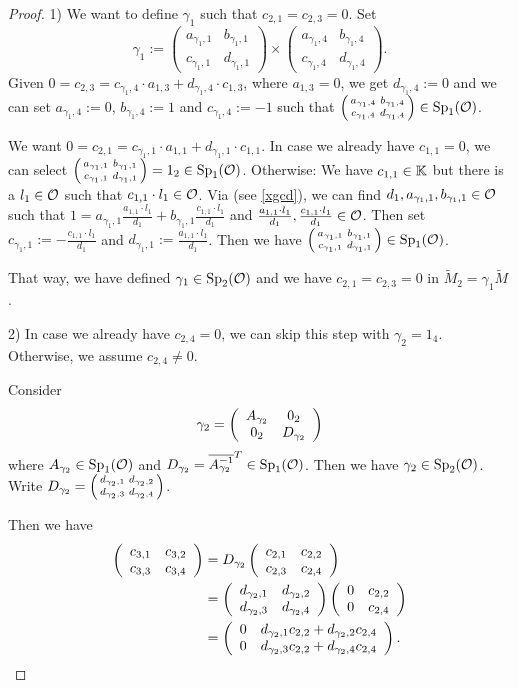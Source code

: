 \begin{lemma}[$solveR$]
\begin{proof}
1) We want to define $\gamma_1$ such that $c_{2,1} = c_{2,3} = 0$.
Set
\[ \gamma_1 := \begin{pmatrix}
a_{\gamma_1,1} & b_{\gamma_1,1} \\
c_{\gamma_1,1} & d_{\gamma_1,1}
\end{pmatrix} \times \begin{pmatrix}
a_{\gamma_1,4} & b_{\gamma_1,4} \\
c_{\gamma_1,4} & d_{\gamma_1,4}
\end{pmatrix} . \]
Given $0 = c_{2,3} = c_{\gamma_1,4} \cdot a_{1,3} + d_{\gamma_1,4} \cdot c_{1,3}$, where $a_{1,3} = 0$, we get $d_{\gamma_1,4} := 0$ and we can set $a_{\gamma_1,4} := 0$, $b_{\gamma_1,4} := 1$ and $c_{\gamma_1,4} := -1$ such that $\left( \begin{smallmatrix} a_{\gamma_1,4} & b_{\gamma_1,4} \\ c_{\gamma_1,4} & d_{\gamma_1,4} \end{smallmatrix} \right) \in \operatorname{Sp}_1(\mathcal{O})$.

We want $0 = c_{2,1} = c_{\gamma_1,1} \cdot a_{1,1} + d_{\gamma_1,1} \cdot c_{1,1}$. In case we already have $c_{1,1} = 0$, we can select $\left( \begin{smallmatrix} a_{\gamma_1,1} & b_{\gamma_1,1} \\ c_{\gamma_1,1} & d_{\gamma_1,1} \end{smallmatrix} \right)  = 1_2 \in \operatorname{Sp}_1(\mathcal{O})$. Otherwise: We have $c_{1,1} \in \mathbb{K}$ but there is a $l_1 \in \mathcal{O}$ such that $c_{1,1} \cdot l_1 \in \mathcal{O}$. Via  (see \cref{xgcd}), we can find $d_1,a_{\gamma_1,1},b_{\gamma_1,1} \in \mathcal{O}$ such that $1 = a_{\gamma_1,1} \frac{a_{1,1} \cdot l_1}{d_1} + b_{\gamma_1,1} \frac{c_{1,1} \cdot l_1}{d_1}$ and $\frac{a_{1,1} \cdot l_1}{d_1},  \frac{c_{1,1} \cdot l_1}{d_1} \in \mathcal{O}$. Then set $c_{\gamma_1,1} := - \frac{c_{1,1} \cdot l_1}{d_1}$ and $d_{\gamma_1,1} := \frac{a_{1,1} \cdot l_1}{d_1}$. Then we have $\left( \begin{smallmatrix} a_{\gamma_1,1} & b_{\gamma_1,1} \\ c_{\gamma_1,1} & d_{\gamma_1,1} \end{smallmatrix} \right) \in \operatorname{Sp}_1(\mathcal{O})$.

That way, we have defined $\gamma_1 \in \operatorname{Sp}_2(\mathcal{O})$ and we have $c_{2,1} = c_{2,3} = 0$ in $\tilde{M}_2 = \gamma_1 \tilde{M}$.

2) In case we already have $c_{2,4} = 0$, we can skip this step with $\gamma_2 = 1_4$. Otherwise, we assume $c_{2,4} \ne 0$.

Consider
\[ \gamma_{2} = \left( \begin{array}{cc} A_{\gamma_2} & 0_2 \\ 0_2 & D_{\gamma_2} \end{array} \right) \]
where $A_{\gamma_2} \in \operatorname{Sp}_1(\mathcal{O})$ and $D_{\gamma_2} = \overline{A_{\gamma_2}^{-1}}^T \in \operatorname{Sp}_1(\mathcal{O})$. Then we have $\gamma_2 \in \operatorname{Sp}_2(\mathcal{O})$. Write $D_{\gamma_2} = \left( \begin{smallmatrix} d_{\gamma_2,1} & d_{\gamma_2,2} \\ d_{\gamma_2,3} & d_{\gamma_2,4} \end{smallmatrix} \right)$.

Then we have
\begin{align*}
\left( \begin{array}{cc} c_{3,1} & c_{3,2} \\ c_{3,3} & c_{3,4} \end{array} \right) &= D_{\gamma_2} \left( \begin{array}{cc} c_{2,1} & c_{2,2} \\ c_{2,3} & c_{2,4} \end{array} \right) \\
&= \left( \begin{array}{cc} d_{\gamma_2,1} & d_{\gamma_2,2} \\ d_{\gamma_2,3} & d_{\gamma_2,4} \end{array} \right) \left( \begin{array}{cc} 0 & c_{2,2} \\ 0 & c_{2,4} \end{array} \right) \\
&= \left( \begin{array}{cc} 0 & d_{\gamma_2,1} c_{2,2} + d_{\gamma_2,2} c_{2,4} \\ 0 & d_{\gamma_2,3} c_{2,2} + d_{\gamma_2,4} c_{2,4} \end{array} \right) .
\end{align*}


\end{proof}
\end{lemma}
